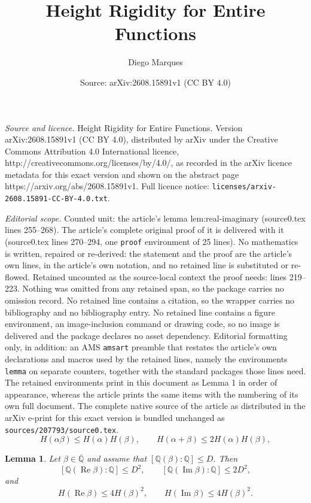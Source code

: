 \documentclass[10pt,a4paper]{amsart}
\title{Height Rigidity for Entire Functions}
\author{Diego Marques}
\date{Source: arXiv:2608.15891v1 (CC BY 4.0)}
\newtheorem{lemma}{Lemma}
\DeclareMathOperator{\ImPart}{Im}
\newcommand{\Q}{\mathbb{Q}}
\newcommand{\Qbar}{\overline{\mathbb{Q}}}
\DeclareMathOperator{\RePart}{Re}
\begin{document}
\maketitle

\noindent\emph{Source and licence.} Height Rigidity for Entire Functions. Version arXiv:2608.15891v1 (CC BY 4.0), distributed by arXiv under the Creative Commons Attribution 4.0 International licence, http://creativecommons.org/licenses/by/4.0/, as recorded in the arXiv licence metadata for this exact version and shown on the abstract page https://arxiv.org/abs/2608.15891v1. Full licence notice: \texttt{licenses/arxiv-2608.15891-CC-BY-4.0.txt}.\par\smallskip

\noindent\textit{Editorial scope.} Counted unit: the article's lemma lem:real-imaginary (source0.tex lines 255--268). The article's complete original proof of it is delivered with it (source0.tex lines 270--294, one \texttt{proof} environment of 25 lines). No mathematics is written, repaired or re-derived: the statement and the proof are the article's own lines, in the article's own notation, and no retained line is substituted or re-flowed.  Retained uncounted as the source-local context the proof needs: lines 219--223.  Nothing was omitted from any retained span, so the package carries no omission record.  No retained line contains a citation, so the wrapper carries no bibliography and no bibliography entry.  No retained line contains a figure environment, an image-inclusion command or drawing code, so no image is delivered and the package declares no asset dependency.  Editorial formatting only, in addition: an AMS \texttt{amsart} preamble that restates the article's own declarations and macros used by the retained lines, namely the environments \texttt{lemma} on separate counters, together with the standard packages those lines need.  The retained environments print in this document as Lemma 1 in order of appearance, whereas the article prints the same items with the numbering of its own full document.  The complete native source of the article as distributed in the arXiv e-print for this exact version is bundled unchanged as \texttt{sources/207793/source0.tex}.
\begin{equation}\label{eq:height-basic}
H(\alpha\beta)\leq H(\alpha)H(\beta),
\qquad
H(\alpha+\beta)\leq2H(\alpha)H(\beta),
\end{equation}

\begin{lemma}\label{lem:real-imaginary}
Let $\beta\in\Qbar$ and assume that $[\Q(\beta):\Q]\leq D$. Then
\[
[\Q(\RePart\beta):\Q]\leq D^2,
\qquad
[\Q(\ImPart\beta):\Q]\leq2D^2,
\]
and
\[
H(\RePart\beta)\leq4H(\beta)^2,
\qquad
H(\ImPart\beta)\leq4H(\beta)^2.
\]
\end{lemma}
\end{document}
